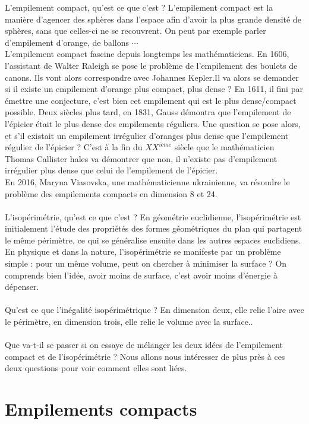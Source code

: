 \documentclass{book}
\begin{document}
L'empilement compact, qu'est ce que c'est ? 
L'empilement compact est la manière d'agencer des sphères dans l'espace afin d'avoir la plus grande densité de sphères, sans que celles-ci ne se recouvrent.
On peut par exemple parler d'empilement d'orange, de ballons $\cdots$\\
L'empilement compact fascine depuis longtemps les mathématiciens. En 1606, l'assistant de Walter Raleigh se pose le problème de l'empilement des boulets de canons. Ils vont alors correspondre avec Johannes Kepler.Il va alors se demander si il existe un empilement d'orange plus compact, plus dense ? En 1611, il fini par émettre une conjecture, c'est bien cet empilement qui est le plus dense/compact possible. \cite{empil4}
Deux siècles plus tard, en 1831, Gauss démontra que l'empilement de l'épicier était le plus dense des empilements réguliers. Une question se pose alors, et s'il existait un empilement irrégulier d'oranges plus dense que l'empilement régulier de l'épicier ?
C'est à la fin du $XX^{ième}$ siècle que le mathématicien Thomas Callister hales va démontrer que non, il n'existe pas d'empilement irrégulier plus dense que celui de l'empilement de l'épicier. \\
En 2016, Maryna Viasovska, une mathématicienne ukrainienne, va résoudre le problème des empilements compacts en dimension 8 et 24.\\\\
L'isopérimétrie, qu'est ce que c'est ?
En géométrie euclidienne, l'isopérimétrie est initialement l'étude des propriétés des formes géométriques du plan qui partagent le même périmètre, ce qui se généralise ensuite dans les autres espaces euclidiens. En physique et dans la nature, l'isopérimétrie se manifeste par un problème simple : pour un même volume, peut on chercher à minimiser la surface ? On comprends bien l'idée, avoir moins de surface, c'est avoir moins d'énergie à dépenser.\\\\
Qu'est ce que l'inégalité isopérimétrique ? En dimension deux, elle relie l'aire avec le périmètre, en dimension trois, elle relie le volume avec la surface..\\\\
Que va-t-il se passer si on essaye de mélanger les deux idées de l'empilement compact et de l'isopérimétrie ?
Nous allons nous intéresser de plus près à ces deux questions pour voir comment elles sont liées.
\cite{empil3}


  
\chapter{Empilements compacts}
\end{document}
